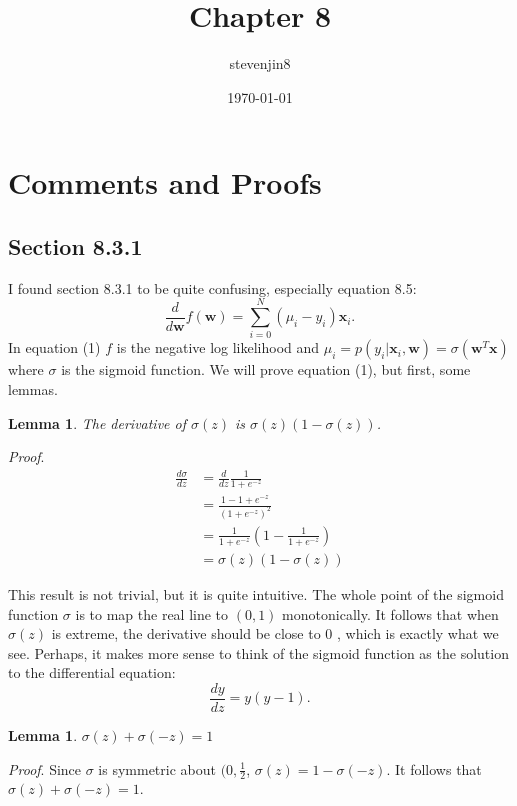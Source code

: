 \documentclass[a4paper,11pt]{article}
\title{Chapter 8}
\author{stevenjin8}
\date{\today}
\theoremstyle{plain}
\newtheorem{lemma}[theorem]{Lemma}
\begin{document}
\maketitle
\section*{Comments and Proofs}
\setcounter{section}{1}
\subsection*{Section 8.3.1}
I found section 8.3.1 to be quite confusing, especially
equation 8.5:
\begin{equation}
    \frac{d}{d\mathbf{w}}f(\mathbf{w}) =
    \sum\limits_{i=0}^{N}(\mu_i-y_i)\mathbf{x}_i.
\end{equation}
In equation (1) $f$ is the negative log likelihood and
$\mu_i=p(y_i | \mathbf{x}_i, \mathbf{w})=\sigma(\mathbf{w}^T
\mathbf{x})$ where $\sigma$ is the sigmoid function.
We will prove equation (1), but first, some lemmas.
\begin{lemma}
The derivative of $\sigma(z)$ is $\sigma(z)(1-\sigma(z))$.
\end{lemma}

\textit{Proof}.
\begin{align*}
    \frac{d\sigma}{dz} & = \frac{d}{dz}\frac{1}{1+
    e^{-z}} \\
    & = \frac{1-1+e^{-z}}{(1+e^{-z})^2} \\
    & = \frac{1}{1+e^{-z}}\left(1-\frac{1}{1+e^{-z}}\right)\\
    & = \sigma(z)(1-\sigma(z))
\end{align*}

This result is not trivial, but it is quite intuitive. The
whole point of the sigmoid function $\sigma$ is to map the
real line to $(0,1)$ monotonically. It follows that when
$\sigma(z)$ is extreme, the derivative should be close to $0$
, which is exactly what we see. Perhaps, it makes more sense
to think of the sigmoid function as the solution to the 
differential equation:
\[
    \frac{dy}{dz}=y(y-1).
\]

\begin{lemma}
    $\sigma(z)+\sigma(-z)=1$
\end{lemma}

\textit{Proof}. Since $\sigma$ is symmetric about
$(0, \frac{1}{2}$, $\sigma(z)=1-\sigma(-z)$. It follows that
$\sigma(z)+\sigma(-z)=1$.
\end{document}

